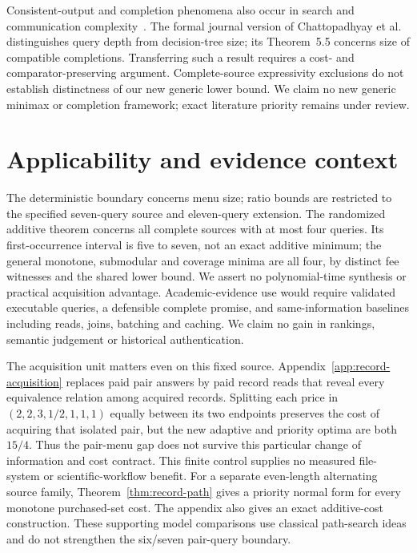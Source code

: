 \documentclass[pdflatex,sn-mathphys-num]{sn-jnl}
\theoremstyle{thmstyleone}
\theoremstyle{thmstylethree}
\theoremstyle{thmstyletwo}
\begin{document}
Consistent-output and completion phenomena also occur in search and communication complexity~\cite{chattopadhyay2025pseudo,goos2026pseudo,watson2026pseudo}. The formal journal version of Chattopadhyay et al. distinguishes query depth from decision-tree size; its Theorem~5.5 concerns size of compatible completions. Transferring such a result requires a cost- and comparator-preserving argument. Complete-source expressivity exclusions do not establish distinctness of our new generic lower bound. We claim no new generic minimax or completion framework; exact literature priority remains under review.

\section{Applicability and evidence context}\label{app:scope-context}
The deterministic boundary concerns menu size; ratio bounds are restricted to the specified seven-query source and eleven-query extension. The randomized additive theorem concerns all complete sources with at most four queries. Its first-occurrence interval is five to seven, not an exact additive minimum; the general monotone, submodular and coverage minima are all four, by distinct fee witnesses and the shared lower bound. We assert no polynomial-time synthesis or practical acquisition advantage. Academic-evidence use would require validated executable queries, a defensible complete promise, and same-information baselines including reads, joins, batching and caching. We claim no gain in rankings, semantic judgement or historical authentication.

The acquisition unit matters even on this fixed source. Appendix~\ref{app:record-acquisition} replaces paid pair answers by paid record reads that reveal every equivalence relation among acquired records. Splitting each price in $(2,2,3,1/2,1,1,1)$ equally between its two endpoints preserves the cost of acquiring that isolated pair, but the new adaptive and priority optima are both $15/4$. Thus the pair-menu gap does not survive this particular change of information and cost contract. This finite control supplies no measured file-system or scientific-workflow benefit. For a separate even-length alternating source family, Theorem~\ref{thm:record-path} gives a priority normal form for every monotone purchased-set cost. The appendix also gives an exact additive-cost construction. These supporting model comparisons use classical path-search ideas and do not strengthen the six/seven pair-query boundary.
\end{document}

